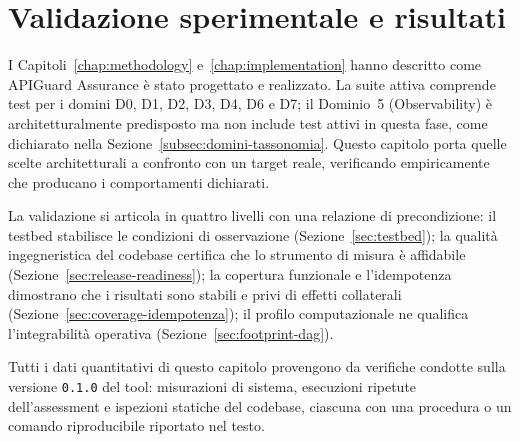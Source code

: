 ﻿%

%
%
%
%


\chapter{Validazione sperimentale e risultati}%
\label{chap:experiments}

I Capitoli~\ref{chap:methodology} e~\ref{chap:implementation} hanno descritto come APIGuard Assurance è stato progettato e realizzato. La suite attiva comprende test per i domini D0, D1, D2, D3, D4, D6 e D7; il Dominio~5 (Observability) è architetturalmente predisposto ma non include test attivi in questa fase, come dichiarato nella Sezione~\ref{subsec:domini-tassonomia}. Questo capitolo porta quelle scelte architetturali a confronto con un target reale, verificando empiricamente che producano i comportamenti dichiarati.

La validazione si articola in quattro livelli con una relazione di precondizione: il testbed stabilisce le condizioni di osservazione (Sezione~\ref{sec:testbed}); la qualità ingegneristica del codebase certifica che lo strumento di misura è affidabile (Sezione~\ref{sec:release-readiness}); la copertura funzionale e l'idempotenza dimostrano che i risultati sono stabili e privi di effetti collaterali (Sezione~\ref{sec:coverage-idempotenza}); il profilo computazionale ne qualifica l'integrabilità operativa (Sezione~\ref{sec:footprint-dag}).

Tutti i dati quantitativi di questo capitolo provengono da verifiche condotte sulla versione \texttt{0.1.0} del tool: misurazioni di sistema, esecuzioni ripetute dell'assessment e ispezioni statiche del codebase, ciascuna con una procedura o un comando riproducibile riportato nel testo.

